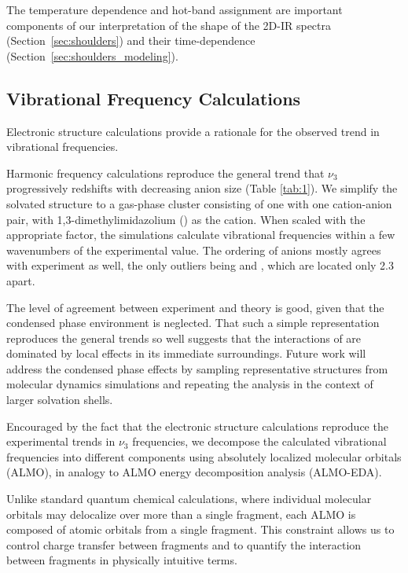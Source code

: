 {The temperature dependence and hot-band assignment are important components of our interpretation of the shape of the 2D-IR spectra (Section~\ref{sec:shoulders}) and their time-dependence (Section~\ref{sec:shoulders_modeling}).

\subsection{Vibrational Frequency Calculations}
\label{sec:vib_calcs}

Electronic structure calculations provide a rationale for the observed trend in vibrational frequencies.

Harmonic frequency calculations reproduce the general trend that \(\nu_3\) progressively redshifts with decreasing anion size (Table \ref{tab:1}).  We simplify the solvated  structure to a gas-phase cluster consisting of one  with one cation-anion pair, with 1,3-dimethylimidazolium () as the cation. When scaled with the appropriate factor\cite{Merrick2007}, the simulations calculate vibrational frequencies within a few wavenumbers of the experimental value. The ordering of anions mostly agrees with experiment as well, the only outliers being \ce{[TFA]-} and \ce{[SCN]-}, which are located only \SI{2.3}{\wavenumber} apart.

The level of agreement between experiment and theory is good, given that the condensed phase environment is neglected. That such a simple representation reproduces the general trends so well suggests that the interactions of  are dominated by local effects in its immediate surroundings. Future work will address the condensed phase effects by sampling representative structures from molecular dynamics simulations and repeating the analysis in the context of larger solvation shells.

Encouraged by the fact that the electronic structure calculations reproduce the experimental trends in \(\nu_3\) frequencies, we decompose the calculated vibrational frequencies into different components using absolutely localized molecular orbitals (ALMO), in analogy to ALMO energy decomposition analysis (ALMO-EDA).\cite{Khaliullin2006,Khaliullin2007,Khaliullin2008}

Unlike standard quantum chemical calculations, where individual molecular orbitals may delocalize over more than a single fragment, each ALMO is composed of atomic orbitals from a single fragment. This constraint allows us to control charge transfer between fragments and to quantify the interaction between fragments in physically intuitive terms.

}
